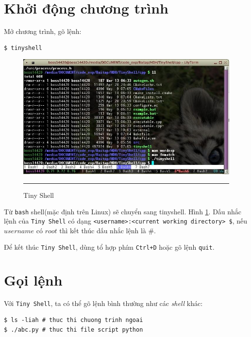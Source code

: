 \documentclass[a4paper,12pt]{report}
\begin{document}
    \section{Khởi động chương trình}
    Mở chương trình, gõ lệnh:
    \begin{verbatim}
$ tinyshell
    \end{verbatim}
    \begin{figure}
        \centering
        \includegraphics[scale=0.7]{ts1}
        \rule{35em}{0.5pt}
        \caption{Tiny Shell}
        \label{fig:ts1}
    \end{figure}

    Từ \texttt{bash} shell(mặc định trên Linux) sẽ chuyển sang tinyshell. Hình
    \ref{fig:ts1}. Dấu nhắc lệnh của \texttt{Tiny Shell} có dạng
    \texttt{<username>:<current working directory> \$}, nếu $username$ có $root$ thì
    kết thúc dấu nhắc lệnh là \#.

    Để kết thúc \texttt{Tiny Shell}, dùng tổ hợp phím \texttt{Ctrl+D} hoặc gõ
    lệnh \texttt{quit}.

    \section{Gọi lệnh}
    Với \texttt{Tiny Shell}, ta có thể gõ lệnh bình thường như các
    \textit{shell} khác:
    \begin{verbatim}
$ ls -liah # thuc thi chuong trinh ngoai
$ ./abc.py # thuc thi file script python
    \end{verbatim}
\end{document}
